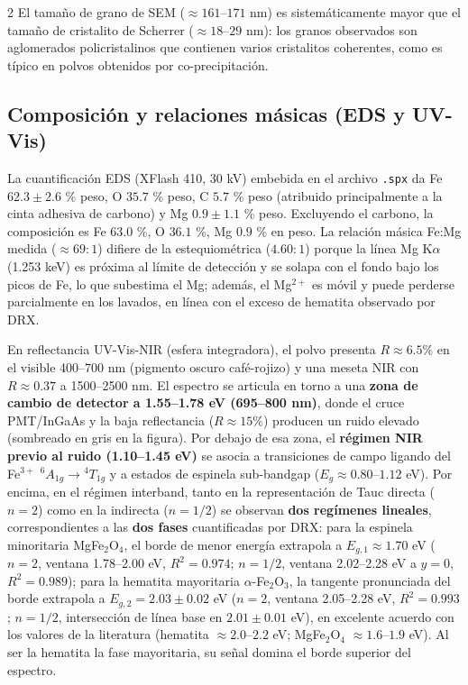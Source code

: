 \documentclass{article}
\begin{document}
\begin{multicols}{2}
El tamaño de grano de SEM ($\approx 161$--$171$ nm) es sistemáticamente mayor que el tamaño de cristalito de Scherrer ($\approx 18$--$29$ nm): los granos observados son aglomerados policristalinos que contienen varios cristalitos coherentes, como es típico en polvos obtenidos por co-precipitación.

\subsection{Composición y relaciones másicas (EDS y UV-Vis)}

La cuantificación EDS (XFlash 410, 30 kV) embebida en el archivo \texttt{.spx} da Fe $62.3 \pm 2.6$ \% peso, O $35.7$ \% peso, C $5.7$ \% peso (atribuido principalmente a la cinta adhesiva de carbono) y Mg $0.9 \pm 1.1$ \% peso. Excluyendo el carbono, la composición es Fe $63.0$ \%, O $36.1$ \%, Mg $0.9$ \% en peso. La relación másica Fe:Mg medida ($\approx 69:1$) difiere de la estequiométrica ($4.60:1$) porque la línea Mg K$\alpha$ (1.253 keV) es próxima al límite de detección y se solapa con el fondo bajo los picos de Fe, lo que subestima el Mg; además, el Mg$^{2+}$ es móvil y puede perderse parcialmente en los lavados, en línea con el exceso de hematita observado por DRX.

En reflectancia UV-Vis-NIR (esfera integradora), el polvo presenta $R \approx 6.5\%$ en el visible 400--700 nm (pigmento oscuro café-rojizo) y una meseta NIR con $R \approx 0.37$ a 1500--2500 nm. El espectro se articula en torno a una \textbf{zona de cambio de detector a 1.55--1.78 eV (695--800 nm)}, donde el cruce PMT/InGaAs y la baja reflectancia ($R \approx 15\%$) producen un ruido elevado (sombreado en gris en la figura). Por debajo de esa zona, el \textbf{régimen NIR previo al ruido (1.10--1.45 eV)} se asocia a transiciones de campo ligando del Fe$^{3+}$ ${}^{6}A_{1g} \rightarrow {}^{4}T_{1g}$ y a estados de espinela sub-bandgap ($E_g \approx 0.80$--$1.12$ eV). Por encima, en el régimen interband, tanto en la representación de Tauc directa ($n=2$) como en la indirecta ($n=1/2$) se observan \textbf{dos regímenes lineales}, correspondientes a las \textbf{dos fases} cuantificadas por DRX: para la espinela minoritaria MgFe$_2$O$_4$, el borde de menor energía extrapola a $E_{g,1} \approx 1.70$ eV ($n=2$, ventana 1.78--2.00 eV, $R^2=0.974$; $n=1/2$, ventana 2.02--2.28 eV a $y=0$, $R^2=0.989$); para la hematita mayoritaria $\alpha$-Fe$_2$O$_3$, la tangente pronunciada del borde extrapola a $E_{g,2} = 2.03 \pm 0.02$ eV ($n=2$, ventana 2.05--2.28 eV, $R^2=0.993$; $n=1/2$, intersección de línea base en $2.01 \pm 0.01$ eV), en excelente acuerdo con los valores de la literatura (hematita $\approx 2.0$--$2.2$ eV; MgFe$_2$O$_4$ $\approx 1.6$--$1.9$ eV). Al ser la hematita la fase mayoritaria, su señal domina el borde superior del espectro.


\end{multicols}
\end{document}
